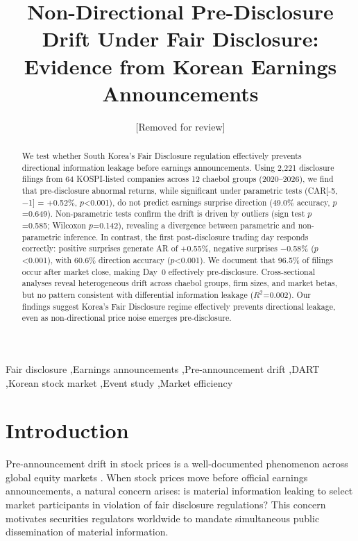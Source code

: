 \documentclass[review,authoryear]{elsarticle}
\begin{document}
\begin{frontmatter}

\title{Non-Directional Pre-Disclosure Drift Under Fair Disclosure: Evidence from Korean Earnings Announcements}

\author[ajou]{[Removed for review]}



\address[ajou]{[Removed for review]}

\begin{abstract}
We test whether South Korea's Fair Disclosure regulation effectively prevents directional information leakage before earnings announcements. Using 2,221 disclosure filings from 64 KOSPI-listed companies across 12 chaebol groups (2020--2026), we find that pre-disclosure abnormal returns, while significant under parametric tests (CAR[-5,$-$1] = +0.52\%, $p$<0.001), do not predict earnings surprise direction (49.0\% accuracy, $p$=0.649). Non-parametric tests confirm the drift is driven by outliers (sign test $p$=0.585; Wilcoxon $p$=0.142), revealing a divergence between parametric and non-parametric inference. In contrast, the first post-disclosure trading day responds correctly: positive surprises generate AR of +0.55\%, negative surprises $-$0.58\% ($p$<0.001), with 60.6\% direction accuracy ($p$<0.001). We document that 96.5\% of filings occur after market close, making Day~0 effectively pre-disclosure. Cross-sectional analyses reveal heterogeneous drift across chaebol groups, firm sizes, and market betas, but no pattern consistent with differential information leakage ($R^2$=0.002). Our findings suggest Korea's Fair Disclosure regime effectively prevents directional leakage, even as non-directional price noise emerges pre-disclosure.
\end{abstract}

\begin{keyword}
Fair disclosure \sep Earnings announcements \sep Pre-announcement drift \sep DART \sep Korean stock market \sep Event study \sep Market efficiency
\end{keyword}

\end{frontmatter}

\section{Introduction}

Pre-announcement drift in stock prices is a well-documented phenomenon across global equity markets \citep{kaniel2012individual}. When stock prices move before official earnings announcements, a natural concern arises: is material information leaking to select market participants in violation of fair disclosure regulations? This concern motivates securities regulators worldwide to mandate simultaneous public dissemination of material information.
\end{document}

